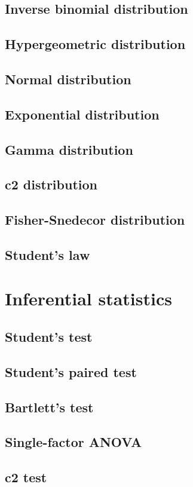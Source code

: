 \documentclass{report}
\begin{document}
	\section{Inverse binomial distribution}
	\section{Hypergeometric distribution}
	\section{Normal distribution}
	\section{Exponential distribution}
	\section{Gamma distribution}
	\section{c2 distribution}
	\section{Fisher-Snedecor distribution}
	\section{Student’s law}

\chapter{Inferential statistics}
	\section{Student’s test}
	\section{Student’s paired test}
	\section{Bartlett’s test}
	\section{Single-factor ANOVA}
	\section{c2 test}
\end{document}
